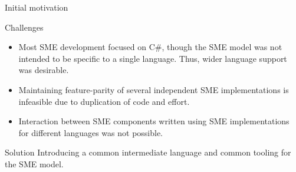 \documentclass{beamer}
\begin{document}
\begin{frame}{Initial motivation}
  \begin{block}{Challenges}
  \begin{itemize}
  \item Most SME development focused on C\#, though the SME model was not
    intended to be specific to a single language. Thus, wider language support
    was desirable.
  \item Maintaining feature-parity of several independent SME implementations is
    infeasible due to duplication of code and effort.
  \item Interaction between SME components written using SME implementations for
    different languages was not possible.
  \end{itemize}
\end{block}

  \pause

  \begin{block}{Solution}
    Introducing a common intermediate language and common tooling for the SME
    model.
  \end{block}

\end{frame}
\end{document}
